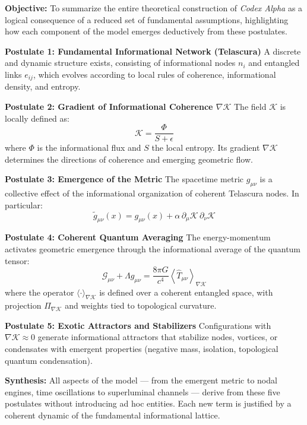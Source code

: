 \documentclass[12pt]{article}
\begin{document}
\textbf{Objective:}  
To summarize the entire theoretical construction of \emph{Codex Alpha} as a logical consequence of a reduced set of fundamental assumptions, highlighting how each component of the model emerges deductively from these postulates.

\textbf{Postulate 1: Fundamental Informational Network (Telascura)}  
A discrete and dynamic structure exists, consisting of informational nodes $n_i$ and entangled links $e_{ij}$, which evolves according to local rules of coherence, informational density, and entropy.

\textbf{Postulate 2: Gradient of Informational Coherence $\nabla \mathcal{K}$}  
The field $\mathcal{K}$ is locally defined as:
\[
    \mathcal{K} = \frac{\Phi}{S + \epsilon}
\]
where $\Phi$ is the informational flux and $S$ the local entropy.  
Its gradient $\nabla \mathcal{K}$ determines the directions of coherence and emerging geometric flow.

\textbf{Postulate 3: Emergence of the Metric}  
The spacetime metric $g_{\mu\nu}$ is a collective effect of the informational organization of coherent Telascura nodes. In particular:
\[
    \tilde{g}_{\mu\nu}(x) = g_{\mu\nu}(x) + \alpha\, \partial_{\mu} \mathcal{K} \, \partial_{\nu} \mathcal{K}
\]

\textbf{Postulate 4: Coherent Quantum Averaging}  
The energy-momentum activates geometric emergence through the informational average of the quantum tensor:
\[
    \mathcal{G}_{\mu\nu} + \Lambda g_{\mu\nu} = \frac{8\pi G}{c^4} \left\langle \hat{T}_{\mu\nu} \right\rangle_{\nabla \mathcal{K}}
\]
where the operator $\langle \cdot \rangle_{\nabla \mathcal{K}}$ is defined over a coherent entangled space, with projection $\Pi_{\nabla \mathcal{K}}$ and weights tied to topological curvature.

\textbf{Postulate 5: Exotic Attractors and Stabilizers}  
Configurations with $\nabla \mathcal{K} \approx 0$ generate informational attractors that stabilize nodes, vortices, or condensates with emergent properties (negative mass, isolation, topological quantum condensation).

\vspace{0.5em}

\textbf{Synthesis:}  
All aspects of the model — from the emergent metric to nodal engines, time oscillations to superluminal channels — derive from these five postulates without introducing ad hoc entities.  
Each new term is justified by a coherent dynamic of the fundamental informational lattice.
\end{document}
